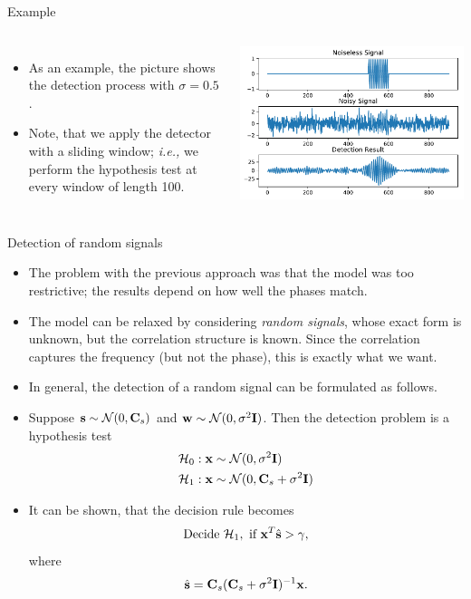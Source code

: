 \documentclass[10pt, aspectratio=169]{beamer} %
\newcommand{\w}{{\bf w}}
\newcommand{\s}{{\bf s}}
\newcommand{\x}{{\bf x}}
\begin{document}
\begin{frame}[fragile]{Example}
\begin{columns}

\begin{itemize}

\item As an example, the  picture shows the detection process with $\sigma = 0.5$.
\item Note, that we apply the detector with a sliding window; \textit{i.e.,} we perform the hypothesis test at every window of length 100.

\end{itemize}

\centerline{\includegraphics[width=\textwidth]{sinusoidDetection.pdf}}
\end{columns}
\end{frame}

\begin{frame}[allowframebreaks=0.8]
 {Detection of random signals}
\begin{itemize}
\item The problem with the previous approach was that the model was too
restrictive; the results depend on how well the phases match.
\item The model can be relaxed by considering \emph{random signals},
whose exact form is unknown, but the correlation structure is known.
Since the correlation captures the frequency (but not the phase),
this is exactly what we want.
\item In general, the detection of a random signal can be formulated as
follows.
\item Suppose $\s \sim {\cal N}(0, {\bf C}_s)$ and $\w \sim {\cal N}(0, \sigma^2 {\bf I})$.
Then the detection problem is a hypothesis test
\begin{align*}
{\cal H}_0&:  \x\sim{\cal N}(0, \sigma^2 {\bf I})\\
{\cal H}_1&:  \x\sim{\cal N}(0, {\bf C}_s + \sigma^2 {\bf I})
\end{align*}
\item It can be shown, that the decision rule becomes
\[
\text{Decide } {\cal H}_1, \text{ if } \x^T\hat{\s} > \gamma,
\]
where
\[
\hat{\s} = {\bf C}_s({\bf C}_s + \sigma^2 {\bf I})^{-1}\x.
\]
\end{itemize}
\end{frame}
\end{document}
